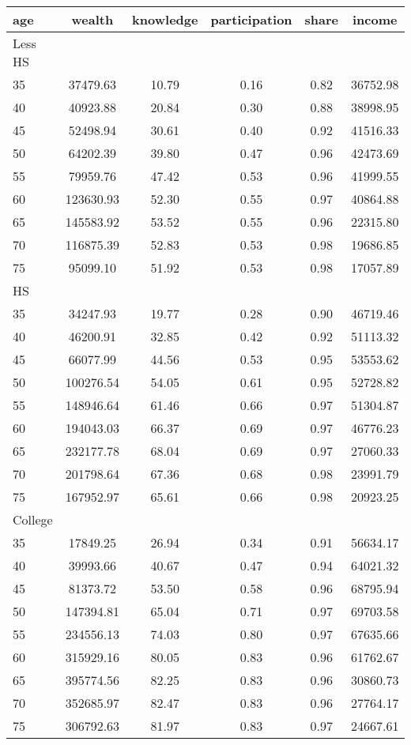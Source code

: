 \begin{tabular}{lccccc}
 \hline \hline
  age & wealth & knowledge & participation & share & income \\
 \hline
 Less HS & & & & & \\
 \hline
35 &  37479.63 &     10.79 &      0.16 &      0.82 &  36752.98 \\ 
40 &  40923.88 &     20.84 &      0.30 &      0.88 &  38998.95 \\ 
45 &  52498.94 &     30.61 &      0.40 &      0.92 &  41516.33 \\ 
50 &  64202.39 &     39.80 &      0.47 &      0.96 &  42473.69 \\ 
55 &  79959.76 &     47.42 &      0.53 &      0.96 &  41999.55 \\ 
60 & 123630.93 &     52.30 &      0.55 &      0.97 &  40864.88 \\ 
65 & 145583.92 &     53.52 &      0.55 &      0.96 &  22315.80 \\ 
70 & 116875.39 &     52.83 &      0.53 &      0.98 &  19686.85 \\ 
75 &  95099.10 &     51.92 &      0.53 &      0.98 &  17057.89 \\ 
 \hline
 HS & & & & & \\
 \hline
35 &  34247.93 &     19.77 &      0.28 &      0.90 &  46719.46 \\ 
40 &  46200.91 &     32.85 &      0.42 &      0.92 &  51113.32 \\ 
45 &  66077.99 &     44.56 &      0.53 &      0.95 &  53553.62 \\ 
50 & 100276.54 &     54.05 &      0.61 &      0.95 &  52728.82 \\ 
55 & 148946.64 &     61.46 &      0.66 &      0.97 &  51304.87 \\ 
60 & 194043.03 &     66.37 &      0.69 &      0.97 &  46776.23 \\ 
65 & 232177.78 &     68.04 &      0.69 &      0.97 &  27060.33 \\ 
70 & 201798.64 &     67.36 &      0.68 &      0.98 &  23991.79 \\ 
75 & 167952.97 &     65.61 &      0.66 &      0.98 &  20923.25 \\ 
 \hline
 College & & & & & \\
 \hline
35 &  17849.25 &     26.94 &      0.34 &      0.91 &  56634.17 \\ 
40 &  39993.66 &     40.67 &      0.47 &      0.94 &  64021.32 \\ 
45 &  81373.72 &     53.50 &      0.58 &      0.96 &  68795.94 \\ 
50 & 147394.81 &     65.04 &      0.71 &      0.97 &  69703.58 \\ 
55 & 234556.13 &     74.03 &      0.80 &      0.97 &  67635.66 \\ 
60 & 315929.16 &     80.05 &      0.83 &      0.96 &  61762.67 \\ 
65 & 395774.56 &     82.25 &      0.83 &      0.96 &  30860.73 \\ 
70 & 352685.97 &     82.47 &      0.83 &      0.96 &  27764.17 \\ 
75 & 306792.63 &     81.97 &      0.83 &      0.97 &  24667.61 \\ 
 \hline \hline
 \end{tabular}
